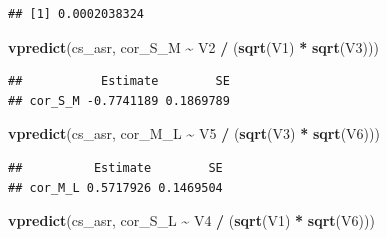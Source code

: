 \documentclass[
  12pt,
]{book}
\newenvironment{Shaded}{\begin{snugshade}}{\end{snugshade}}
\newcommand{\DataTypeTok}[1]{\textcolor[rgb]{0.13,0.29,0.53}{#1}}
\newcommand{\DecValTok}[1]{\textcolor[rgb]{0.00,0.00,0.81}{#1}}
\newcommand{\KeywordTok}[1]{\textcolor[rgb]{0.13,0.29,0.53}{\textbf{#1}}}
\newcommand{\NormalTok}[1]{#1}
\newcommand{\OperatorTok}[1]{\textcolor[rgb]{0.81,0.36,0.00}{\textbf{#1}}}
\newcommand{\OtherTok}[1]{\textcolor[rgb]{0.56,0.35,0.01}{#1}}
\newcommand{\StringTok}[1]{\textcolor[rgb]{0.31,0.60,0.02}{#1}}
\begin{document}
\begin{Shaded}
\end{Shaded}

\begin{verbatim}
## [1] 0.0002038324
\end{verbatim}

\begin{Shaded}
\begin{Highlighting}[]
\KeywordTok{vpredict}\NormalTok{(cs\_asr, cor\_S\_M }\OperatorTok{\textasciitilde{}}\StringTok{ }\NormalTok{V2 }\OperatorTok{/}\StringTok{ }\NormalTok{(}\KeywordTok{sqrt}\NormalTok{(V1) }\OperatorTok{*}\StringTok{ }\KeywordTok{sqrt}\NormalTok{(V3)))}
\end{Highlighting}
\end{Shaded}

\begin{verbatim}
##           Estimate        SE
## cor_S_M -0.7741189 0.1869789
\end{verbatim}

\begin{Shaded}
\begin{Highlighting}[]
\KeywordTok{vpredict}\NormalTok{(cs\_asr, cor\_M\_L }\OperatorTok{\textasciitilde{}}\StringTok{ }\NormalTok{V5 }\OperatorTok{/}\StringTok{ }\NormalTok{(}\KeywordTok{sqrt}\NormalTok{(V3) }\OperatorTok{*}\StringTok{ }\KeywordTok{sqrt}\NormalTok{(V6)))}
\end{Highlighting}
\end{Shaded}

\begin{verbatim}
##          Estimate        SE
## cor_M_L 0.5717926 0.1469504
\end{verbatim}

\begin{Shaded}
\begin{Highlighting}[]
\KeywordTok{vpredict}\NormalTok{(cs\_asr, cor\_S\_L }\OperatorTok{\textasciitilde{}}\StringTok{ }\NormalTok{V4 }\OperatorTok{/}\StringTok{ }\NormalTok{(}\KeywordTok{sqrt}\NormalTok{(V1) }\OperatorTok{*}\StringTok{ }\KeywordTok{sqrt}\NormalTok{(V6)))}
\end{Highlighting}
\end{Shaded}
\end{document}
